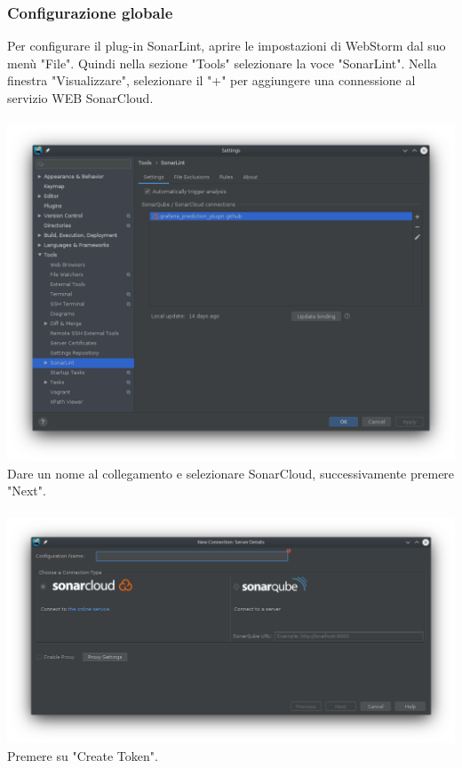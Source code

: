 \subsubsection{Configurazione globale}
Per configurare il plug-in SonarLint, aprire le impostazioni di WebStorm dal suo menù "File". Quindi nella sezione "Tools" selezionare la voce "SonarLint". Nella finestra "Visualizzare", selezionare il "+" per aggiungere una connessione al servizio WEB SonarCloud.
\\
\\
\includegraphics[width=\textwidth,height=\textheight,keepaspectratio]{img/connection.png}
\pagebreak
\\
Dare un nome al collegamento e selezionare SonarCloud, successivamente premere "Next".
\\
\\
\includegraphics[width=\textwidth,height=\textheight,keepaspectratio]{img/connection-name.png}
\\
Premere su "Create Token".
